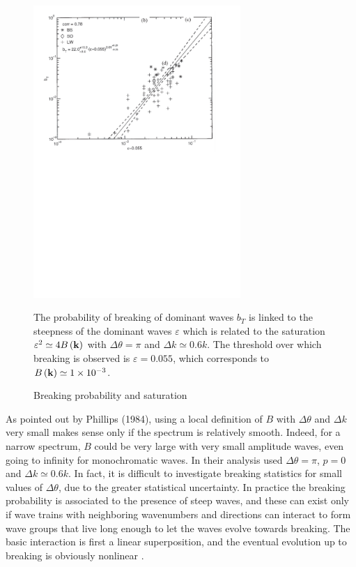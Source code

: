 \begin{figure}
\centerline{\includegraphics[width=0.7\textwidth]{FIGS_CH_SOURCETERMS/breaking_threshold.pdf}}
\caption{Breaking probability and saturation}{The probability of breaking of dominant waves $b_T$ is linked to the 
steepness of the dominant waves $\varepsilon$ which is related 
to the saturation $\varepsilon^2\simeq 4 B\left(\mathbf{k}\right)$ with $\Delta
\theta =\pi$ and $\Delta k \simeq 0.6 k$. The threshold over which breaking is observed is $\varepsilon=0.055$, 
which corresponds to $B\left(\mathbf{k}\right) \simeq 1\times
10^{-3}$.}\label{figsaturation}
\end{figure}

As pointed out by Phillips
(1984\nocite{Phillips1984}), using a local definition of $B$ with $\Delta \theta$ and $
\Delta k$ very small makes sense only if the spectrum is relatively smooth. Indeed, for a narrow spectrum,   $B$
could be very large with very small amplitude waves, even going to infinity for 
monochromatic waves.  In their analysis \cite{Banner&al.2000} used $\Delta \theta
=\pi$, $p=0$ and $\Delta k \simeq 0.6 k$. In fact, it is difficult to investigate breaking statistics for small values of 
$\Delta \theta$, due to the greater statistical uncertainty. In practice the breaking probability is 
associated to the presence of steep waves, and these can exist only if wave trains with neighboring wavenumbers and directions 
can interact to form wave groups that live long enough to let the waves evolve towards breaking. The basic interaction is first 
a linear superposition, and the eventual evolution up to breaking is obviously nonlinear \citep[e.g.][]{Song&Banner2002}. 

